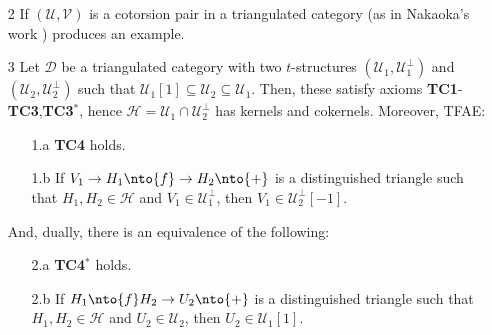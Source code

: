 \begin{enumerate}
  \item[2] If $(\mathcal{U},\mathcal{V})$ is a cotorsion pair in a triangulated
  category (as in Nakaoka's work ) produces an example.
  \item[3] Let $\mathcal{D}$ be a triangulated category with two $t$-structures
  $(\mathcal{U}_1,\mathcal{U}_1^\perp)$ and $(\mathcal{U}_2,\mathcal{U}_2^\perp)$ such that
  $\mathcal{U}_1[1]\subseteq\mathcal{U}_2\subseteq\mathcal{U}_1$. Then, these satisfy
  axioms \textbf{TC1}-\textbf{TC3},\textbf{TC3$^*$}, hence $\mathcal{H}=\mathcal{U}_1\cap\mathcal{U}_2^\perp$ has
  kernels and cokernels. Moreover, TFAE:
  \begin{enumerate}
    \item[1.a] \textbf{TC4} holds.
    \item[1.b] If $V_1\to H_1\nto{f}\to H_2\nto{+}$ is a distinguished triangle such
    that $H_1, H_2\in\mathcal{H}$ and $V_1\in\mathcal{U}_1^\perp$, then $V_1\in\mathcal{U}_2^\perp[-1]$.
  \end{enumerate}
  And, dually, there is an equivalence of the following:
  \begin{enumerate}
    \item[2.a] \textbf{TC4$^*$} holds.
    \item[2.b]\label{ax:eqa} If $H_1\nto{f}H_2\to U_2\nto{+}$ is a distinguished triangle such
    that $H_1,H_2\in\mathcal{H}$ and $U_2\in\mathcal{U}_2$, then $U_2\in\mathcal{U}_1[1]$.
  \end{enumerate}
\end{enumerate}

